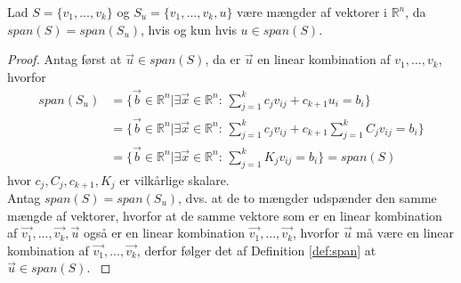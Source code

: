 \begin{stn}
Lad $S = \{v_1,...,v_k\}$ og $S_u = \{v_1,...,v_k, u\}$ være mængder af vektorer i $\mathds{R}^n$, da $span(S) = span(S_u)$, hvis og kun hvis $u \in span(S)$.
\end{stn}
\begin{proof}
Antag først at $\vec{u} \in span(S)$, da er $\vec{u}$ en linear kombination af $v_1,..., v_k$, hvorfor
\begin{align*}
span(S_u) &= \{ \vec{b} \in \mathds{R}^n| \exists \vec{x} \in \mathds{R}^n: \, \sum_{j=1}^k c_j v_{ij} + c_{k+1} u_i  = b_i\}
\\&= \{ \vec{b} \in \mathds{R}^n| \exists \vec{x} \in \mathds{R}^n: \, \sum_{j=1}^k c_j v_{ij} + c_{k+1} \sum_{j=1}^k C_j v_{ij}  = b_i\}
\\&= \{ \vec{b} \in \mathds{R}^n| \exists \vec{x} \in \mathds{R}^n: \, \sum_{j=1}^k K_j v_{ij}  = b_i\} = span(S)
\end{align*}
hvor $c_j, C_j, c_{k+1}, K_j$ er vilkårlige skalare.
\\ Antag $span(S) = span(S_u)$, dvs. at de to mængder udspænder den samme mængde af vektorer, hvorfor at de samme vektore som er en linear kombination af $\vec{v_1},...,\vec{v_k}, \vec{u}$ også er en linear kombination $\vec{v_1},..., \vec{v_k}$, hvorfor $\vec{u}$ må være en linear kombination af  $\vec{v_1},..., \vec{v_k}$, derfor følger det af Definition \ref{def:span} at $\vec{u} \in span(S).$
\label{stn:akvivalentespan}
\end{proof}


